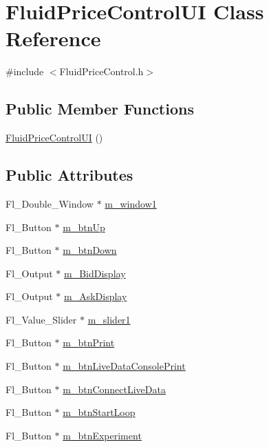 \hypertarget{class_fluid_price_control_u_i}{}\section{Fluid\+Price\+Control\+UI Class Reference}
\label{class_fluid_price_control_u_i}


{\ttfamily \#include $<$Fluid\+Price\+Control.\+h$>$}

\subsection*{Public Member Functions}
\begin{DoxyCompactItemize}
\item 
\hyperlink{class_fluid_price_control_u_i_a2cda3cd2bdafd0550ffd992166db9f9b}{Fluid\+Price\+Control\+UI} ()
\end{DoxyCompactItemize}
\subsection*{Public Attributes}
\begin{DoxyCompactItemize}
\item 
Fl\+\_\+\+Double\+\_\+\+Window $\ast$ \hyperlink{class_fluid_price_control_u_i_a65c8356043b3a182a177cf4a52317124}{m\+\_\+window1}
\item 
Fl\+\_\+\+Button $\ast$ \hyperlink{class_fluid_price_control_u_i_a17dcc8d29c4170578c8305d0bbce0f89}{m\+\_\+btn\+Up}
\item 
Fl\+\_\+\+Button $\ast$ \hyperlink{class_fluid_price_control_u_i_a98213f3a52dd6c6b700f5a20f1cfa7ab}{m\+\_\+btn\+Down}
\item 
Fl\+\_\+\+Output $\ast$ \hyperlink{class_fluid_price_control_u_i_afcc19c4bc7bc7295854861d2f667f457}{m\+\_\+\+Bid\+Display}
\item 
Fl\+\_\+\+Output $\ast$ \hyperlink{class_fluid_price_control_u_i_a68a7585dc66f65459fa6c38c086299f8}{m\+\_\+\+Ask\+Display}
\item 
Fl\+\_\+\+Value\+\_\+\+Slider $\ast$ \hyperlink{class_fluid_price_control_u_i_ad57bb65dd4c67780a86158e5d2ac7b90}{m\+\_\+slider1}
\item 
Fl\+\_\+\+Button $\ast$ \hyperlink{class_fluid_price_control_u_i_a0f591e3a87e7a68d05d1b17625d7de87}{m\+\_\+btn\+Print}
\item 
Fl\+\_\+\+Button $\ast$ \hyperlink{class_fluid_price_control_u_i_a6a6870f04d6e93c70975e8dbc463c8eb}{m\+\_\+btn\+Live\+Data\+Console\+Print}
\item 
Fl\+\_\+\+Button $\ast$ \hyperlink{class_fluid_price_control_u_i_a298e80045e3c1ea8cabbc21b0b3138ca}{m\+\_\+btn\+Connect\+Live\+Data}
\item 
Fl\+\_\+\+Button $\ast$ \hyperlink{class_fluid_price_control_u_i_a41892b034300821670f3e585bdd191a3}{m\+\_\+btn\+Start\+Loop}
\item 
Fl\+\_\+\+Button $\ast$ \hyperlink{class_fluid_price_control_u_i_ad94515ca4f97533e76a67e04bf4411e4}{m\+\_\+btn\+Experiment}
\end{DoxyCompactItemize}


